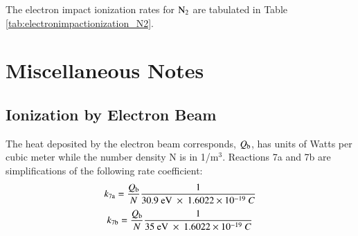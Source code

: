 \documentclass{warpdoc}
\begin{document}
The electron impact ionization rates for $\rm N_2$ are tabulated in Table \ref{tab:electronimpactionization_N2}.



\section{Miscellaneous Notes}

\subsection{Ionization by Electron Beam}

 The heat deposited by the electron beam  corresponds, $Q_{\rm b}$, has units of Watts per cubic meter while the number density N is in 1/m$^3$. Reactions 7a and 7b are simplifications of the following rate coefficient:
%
\begin{equation}
  k_{\rm 7a}=\frac{Q_{\rm b}}{N} \frac{1}{30.9 {\rm ~eV} ~\times~ 1.6022 \times 10^{-19}~C}
\end{equation}
%
%
\begin{equation}
  k_{\rm 7b}=\frac{Q_{\rm b}}{N} \frac{1}{35 {\rm ~eV} ~\times~ 1.6022 \times 10^{-19}~C}
\end{equation}
%







\end{document}
